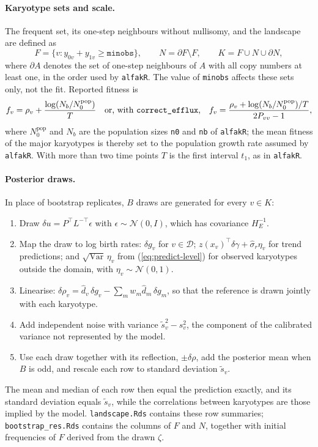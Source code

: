 \documentclass[11pt]{article}
\newcommand{\Normal}{\mathcal{N}}
\begin{document}
\paragraph{Karyotype sets and scale.}
The frequent set, its one-step neighbours without nullisomy, and the
landscape are defined as
\begin{equation}
  F=\{v:y_{0v}+y_{1v}\ge\texttt{minobs}\},\qquad
  N=\partial F\setminus F,\qquad
  K=F\cup N\cup\partial N,
  \label{eq:alfakR-sets}
\end{equation}
where $\partial A$ denotes the set of one-step neighbours of $A$ with all copy
numbers at least one, in the order used by \texttt{alfakR}. The value of
\texttt{minobs} affects these sets only, not the fit. Reported fitness is
\begin{equation}
  f_v=\rho_v+\frac{\log(N_b/N_0^{\mathrm{pop}})}{T}
  \quad\text{or, with \texttt{correct\_efflux},}\quad
  f_v=\frac{\rho_v+\log(N_b/N_0^{\mathrm{pop}})/T}{2P_{vv}-1},
  \label{eq:alfakR-scale}
\end{equation}
where $N_0^{\mathrm{pop}}$ and $N_b$ are the population sizes \texttt{n0} and
\texttt{nb} of \texttt{alfakR}; the mean fitness of the major karyotypes is
thereby set to the population growth rate assumed by \texttt{alfakR}. With
more than two time points $T$ is the first interval $t_1$, as in \texttt{alfakR}.

\paragraph{Posterior draws.}
In place of bootstrap replicates, $B$ draws are generated for every
$v\in K$:
\begin{enumerate}
\item Draw $\delta u=P^\top L^{-\top}\epsilon$ with
$\epsilon\sim\Normal(0,I)$, which has covariance $H_E^{-1}$.
\item Map the draw to log birth rates: $\delta g_v$ for $v\in\mathcal{D}$;
$z(x_v)^\top\delta\gamma+\hat\sigma_r\eta_v$ for trend predictions; and
$\sqrt{\operatorname{Var}}\,\eta_v$ from (\ref{eq:predict-level}) for observed
karyotypes outside the domain, with $\eta_v\sim\Normal(0,1)$.
\item Linearise:
$\delta\rho_v=\hat d_v\,\delta g_v-\sum_mw_m\hat d_m\,\delta g_m$, so that the
reference is drawn jointly with each karyotype.
\item Add independent noise with variance $\tilde s_v^2-s_v^2$, the component
of the calibrated variance not represented by the model.
\item Use each draw together with its reflection, $\pm\delta\rho$, add the
posterior mean when $B$ is odd, and rescale each row to standard deviation
$\tilde s_v$.
\end{enumerate}
The mean and median of each row then equal the prediction exactly, and its
standard deviation equals $\tilde s_v$, while the correlations between
karyotypes are those implied by the model. \texttt{landscape.Rds} contains
these row summaries; \texttt{bootstrap\_res.Rds} contains the columns of $F$
and $N$, together with initial frequencies of $F$ derived from the drawn
$\zeta$.
\end{document}
